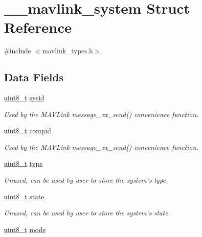 \hypertarget{struct____mavlink__system}{\section{\-\_\-\-\_\-mavlink\-\_\-system Struct Reference}
\label{struct____mavlink__system}
}


{\ttfamily \#include $<$mavlink\-\_\-types.\-h$>$}

\subsection*{Data Fields}
\begin{DoxyCompactItemize}
\item 
\hyperlink{stdint_8h_aba7bc1797add20fe3efdf37ced1182c5}{uint8\-\_\-t} \hyperlink{struct____mavlink__system_a3533dcc52fcacb13bb3190ae847e8260}{sysid}
\begin{DoxyCompactList}\small\item\em Used by the M\-A\-V\-Link message\-\_\-xx\-\_\-send() convenience function. \end{DoxyCompactList}\item 
\hyperlink{stdint_8h_aba7bc1797add20fe3efdf37ced1182c5}{uint8\-\_\-t} \hyperlink{struct____mavlink__system_a1aec3b4f214beea3276a214c7498cb0f}{compid}
\begin{DoxyCompactList}\small\item\em Used by the M\-A\-V\-Link message\-\_\-xx\-\_\-send() convenience function. \end{DoxyCompactList}\item 
\hyperlink{stdint_8h_aba7bc1797add20fe3efdf37ced1182c5}{uint8\-\_\-t} \hyperlink{struct____mavlink__system_aab94b93e251cac8de298a0ff90c41b8f}{type}
\begin{DoxyCompactList}\small\item\em Unused, can be used by user to store the system's type. \end{DoxyCompactList}\item 
\hyperlink{stdint_8h_aba7bc1797add20fe3efdf37ced1182c5}{uint8\-\_\-t} \hyperlink{struct____mavlink__system_ac5afa4a95067ba7b21d4884a740cc413}{state}
\begin{DoxyCompactList}\small\item\em Unused, can be used by user to store the system's state. \end{DoxyCompactList}\item 
\hyperlink{stdint_8h_aba7bc1797add20fe3efdf37ced1182c5}{uint8\-\_\-t} \hyperlink{struct____mavlink__system_a4bd3edea462570856b5575eecafd2b6d}{mode}

\end{DoxyCompactItemize}
